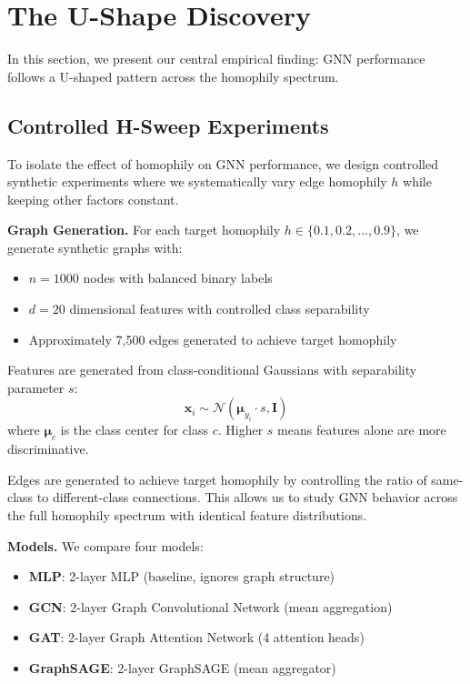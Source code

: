 
\section{The U-Shape Discovery}
\label{sec:ushape}

In this section, we present our central empirical finding: GNN performance follows a U-shaped pattern across the homophily spectrum.

\subsection{Controlled H-Sweep Experiments}

To isolate the effect of homophily on GNN performance, we design controlled synthetic experiments where we systematically vary edge homophily $h$ while keeping other factors constant.

\textbf{Graph Generation.} For each target homophily $h \in \{0.1, 0.2, ..., 0.9\}$, we generate synthetic graphs with:
\begin{itemize}
    \item $n = 1000$ nodes with balanced binary labels
    \item $d = 20$ dimensional features with controlled class separability
    \item Approximately 7,500 edges generated to achieve target homophily
\end{itemize}

Features are generated from class-conditional Gaussians with separability parameter $s$:
\begin{equation}
    \mathbf{x}_i \sim \mathcal{N}(\boldsymbol{\mu}_{y_i} \cdot s, \mathbf{I})
\end{equation}
where $\boldsymbol{\mu}_c$ is the class center for class $c$. Higher $s$ means features alone are more discriminative.

Edges are generated to achieve target homophily by controlling the ratio of same-class to different-class connections. This allows us to study GNN behavior across the full homophily spectrum with identical feature distributions.

\textbf{Models.} We compare four models:
\begin{itemize}
    \item \textbf{MLP}: 2-layer MLP (baseline, ignores graph structure)
    \item \textbf{GCN}: 2-layer Graph Convolutional Network (mean aggregation)
    \item \textbf{GAT}: 2-layer Graph Attention Network (4 attention heads)
    \item \textbf{GraphSAGE}: 2-layer GraphSAGE (mean aggregator)
\end{itemize}

